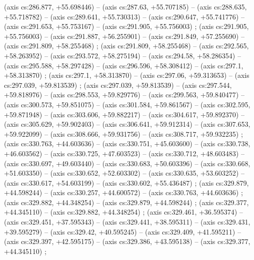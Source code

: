     (axis cs:286.877,    +55.698446) --  (axis cs:287.63,    +55.707185) --  (axis cs:288.635,    +55.718782) --  (axis cs:289.641,    +55.730313) --  (axis cs:290.647,    +55.741776) --  (axis cs:291.653,    +55.753167) --  (axis cs:291.905,    +55.756003) ;
    (axis cs:291.905,    +55.756003) --  (axis cs:291.887,    +56.255901) --  (axis cs:291.849,    +57.255690) --  (axis cs:291.809,    +58.255468) ;
    (axis cs:291.809,    +58.255468) --  (axis cs:292.565,    +58.263952) --  (axis cs:293.572,    +58.275194) --  (axis cs:294.58,    +58.286354) --  (axis cs:295.588,    +58.297428) --  (axis cs:296.596,    +58.308412) --  (axis cs:297.1,    +58.313870) ;
    (axis cs:297.1,    +58.313870) --  (axis cs:297.06,    +59.313653) --  (axis cs:297.039,    +59.813539) ;
    (axis cs:297.039,    +59.813539) --  (axis cs:297.544,    +59.818976) --  (axis cs:298.553,    +59.829776) --  (axis cs:299.563,    +59.840477) --  (axis cs:300.573,    +59.851075) --  (axis cs:301.584,    +59.861567) --  (axis cs:302.595,    +59.871948) --  (axis cs:303.606,    +59.882217) --  (axis cs:304.617,    +59.892370) --  (axis cs:305.629,    +59.902403) --  (axis cs:306.641,    +59.912314) --  (axis cs:307.653,    +59.922099) --  (axis cs:308.666,    +59.931756) --  (axis cs:308.717,    +59.932235) ;
    (axis cs:330.763,    +44.603636) --  (axis cs:330.751,    +45.603600) --  (axis cs:330.738,    +46.603562) --  (axis cs:330.725,    +47.603523) --  (axis cs:330.712,    +48.603483) --  (axis cs:330.697,    +49.603440) --  (axis cs:330.683,    +50.603396) --  (axis cs:330.668,    +51.603350) --  (axis cs:330.652,    +52.603302) --  (axis cs:330.635,    +53.603252) --  (axis cs:330.617,    +54.603199) --  (axis cs:330.602,    +55.436487) ;
    (axis cs:329.879,    +44.598244) --  (axis cs:330.257,    +44.600572) --  (axis cs:330.763,    +44.603636) ;
    (axis cs:329.882,    +44.348254) --  (axis cs:329.879,    +44.598244) ;
    (axis cs:329.377,    +44.345110) --  (axis cs:329.882,    +44.348254) ;
    (axis cs:329.461,    +36.595374) --  (axis cs:329.451,    +37.595343) --  (axis cs:329.441,    +38.595311) --  (axis cs:329.431,    +39.595279) --  (axis cs:329.42,    +40.595245) --  (axis cs:329.409,    +41.595211) --  (axis cs:329.397,    +42.595175) --  (axis cs:329.386,    +43.595138) --  (axis cs:329.377,    +44.345110) ;
